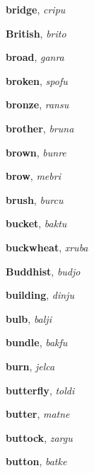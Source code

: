\documentclass[12pt]{book}
\begin{document}
\begin{description}
\item[ ] \textbf{bridge}, \textit{cripu}

\item[ ] \textbf{British}, \textit{brito}

\item[ ] \textbf{broad}, \textit{ganra}

\item[ ] \textbf{broken}, \textit{spofu}

\item[ ] \textbf{bronze}, \textit{ransu}

\item[ ] \textbf{brother}, \textit{bruna}

\item[ ] \textbf{brown}, \textit{bunre}

\item[ ] \textbf{brow}, \textit{mebri}

\item[ ] \textbf{brush}, \textit{burcu}

\item[ ] \textbf{bucket}, \textit{baktu}

\item[ ] \textbf{buckwheat}, \textit{xruba}

\item[ ] \textbf{Buddhist}, \textit{budjo}

\item[ ] \textbf{building}, \textit{dinju}

\item[ ] \textbf{bulb}, \textit{balji}

\item[ ] \textbf{bundle}, \textit{bakfu}

\item[ ] \textbf{burn}, \textit{jelca}

\item[ ] \textbf{butterfly}, \textit{toldi}

\item[ ] \textbf{butter}, \textit{matne}

\item[ ] \textbf{buttock}, \textit{zargu}

\item[ ] \textbf{button}, \textit{batke}



\end{description}
\end{document}
